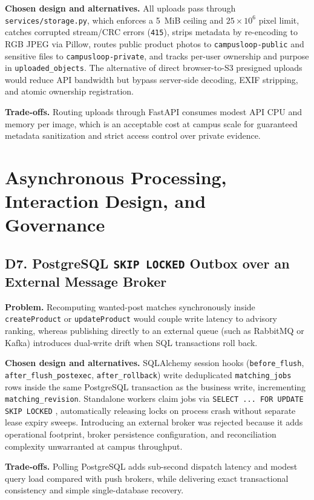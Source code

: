\textbf{Chosen design and alternatives.} All uploads pass through \texttt{services/storage.py}, which enforces a 5~MiB ceiling and $25\times 10^6$ pixel limit, catches corrupted stream/CRC errors (\texttt{415}), strips metadata by re-encoding to RGB JPEG via Pillow, routes public product photos to \texttt{campusloop-public} and sensitive files to \texttt{campusloop-private}, and tracks per-user ownership and purpose in \texttt{uploaded\_objects}. The alternative of direct browser-to-S3 presigned uploads would reduce API bandwidth but bypass server-side decoding, EXIF stripping, and atomic ownership registration.

\textbf{Trade-offs.} Routing uploads through FastAPI consumes modest API CPU and memory per image, which is an acceptable cost at campus scale for guaranteed metadata sanitization and strict access control over private evidence.

\section{Asynchronous Processing, Interaction Design, and Governance}
\label{sec:dec-workflow}

\subsection{D7. PostgreSQL \texttt{SKIP LOCKED} Outbox over an External Message Broker}

\textbf{Problem.} Recomputing wanted-post matches synchronously inside \texttt{createProduct} or \texttt{updateProduct} would couple write latency to advisory ranking, whereas publishing directly to an external queue (such as RabbitMQ or Kafka) introduces dual-write drift when SQL transactions roll back.

\textbf{Chosen design and alternatives.} SQLAlchemy session hooks (\texttt{before\_flush}, \texttt{after\_flush\_postexec}, \texttt{after\_rollback}) write deduplicated \texttt{matching\_jobs} rows inside the same PostgreSQL transaction as the business write, incrementing \texttt{matching\_revision}. Standalone workers claim jobs via \texttt{SELECT ... FOR UPDATE SKIP LOCKED} \cite{postgresExplicitLocking}, automatically releasing locks on process crash without separate lease expiry sweeps. Introducing an external broker was rejected because it adds operational footprint, broker persistence configuration, and reconciliation complexity unwarranted at campus throughput.

\textbf{Trade-offs.} Polling PostgreSQL adds sub-second dispatch latency and modest query load compared with push brokers, while delivering exact transactional consistency and simple single-database recovery.

